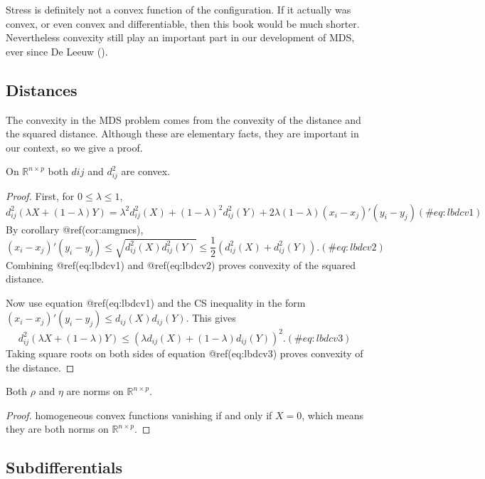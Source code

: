 \documentclass[
  12pt,
  letterpaper,
  DIV=11,
  numbers=noendperiod]{scrreprt}
\theoremstyle{remark}
\begin{document}
Stress is definitely not a convex function of the configuration. If it
actually was convex, or even convex and differentiable, then this book
would be much shorter. Nevertheless convexity still play an important
part in our development of MDS, ever since De Leeuw
().

\subsection{Distances}\label{distances-1}

The convexity in the MDS problem comes from the convexity of the
distance and the squared distance. Although these are elementary facts,
they are important in our context, so we give a proof.

On \(\mathbb{R}^{n\times p}\) both \(d{ij}\) and \(d_{ij}^2\) are
convex.

\begin{proof}
First, for \(0\leq\lambda\leq 1\), \begin{equation}
d_{ij}^2(\lambda X+(1-\lambda)Y)
=\lambda^2d_{ij}^2(X) + (1-\lambda)^2d_{ij}^2(Y)+2\lambda(1-\lambda)(x_i-x_j)'(y_i-y_j)
(\#eq:lbdcv1)
\end{equation} By corollary @ref(cor:amgmcs), \begin{equation}
(x_i-x_j)'(y_i-y_j)\leq\sqrt{d_{ij}^2(X)d_{ij}^2(Y)}
\leq\frac12(d_{ij}^2(X)+d_{ij}^2(Y)).
(\#eq:lbdcv2)
\end{equation} Combining @ref(eq:lbdcv1) and @ref(eq:lbdcv2) proves
convexity of the squared distance.

Now use equation @ref(eq:lbdcv1) and the CS inequality in the form
\((x_i-x_j)'(y_i-y_j)\leq d_{ij}(X)d_{ij}(Y)\). This gives
\begin{equation}
d_{ij}^2(\lambda X +(1-\lambda)Y)\leq (\lambda d_{ij}(X)+(1-\lambda)d_{ij}(Y))^2.
(\#eq:lbdcv3)
\end{equation} Taking square roots on both sides of equation
@ref(eq:lbdcv3) proves convexity of the distance.
\end{proof}

Both \(\rho\) and \(\eta\) are norms on \(\mathbb{R}^{n\times p}\).

\begin{proof}
homogeneous convex functions vanishing if and only if \(X=0\), which
means they are both norms on \(\mathbb{R}^{n\times p}\).
\end{proof}

\subsection{Subdifferentials}\label{subdifdef}
\end{document}
